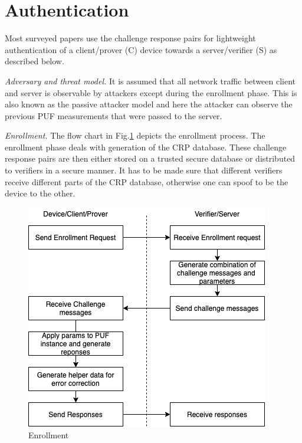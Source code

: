 \documentclass[journal, a4paper]{IEEEtran}
\begin{document}
\section{Authentication}
Most surveyed papers use the challenge response pairs for lightweight authentication of a client/prover (C) device towards a server/verifier (S) as described below.

\textit{Adversary and threat model.} It is assumed that all network traffic between client and server is observable by attackers except during the enrollment phase. This is also known as the passive attacker model and here the attacker can observe the previous PUF measurements that were passed to the server.

\textit{Enrollment.} The flow chart in Fig.\ref{fig:enroll} depicts the enrollment process. The enrollment phase deals with generation of the CRP database. These challenge response pairs are then either stored on a trusted secure database or distributed to verifiers in a secure manner. It has to be made sure that different verifiers receive different parts of the CRP database, otherwise one can spoof to be the device to the other.

\begin{figure}[!hbt]
    \begin{center}
    \includegraphics[scale=0.5]{figs/enrollment.png}
    \caption{Enrollment}
    \label{fig:enroll}
    \end{center}
\end{figure}
\end{document}
